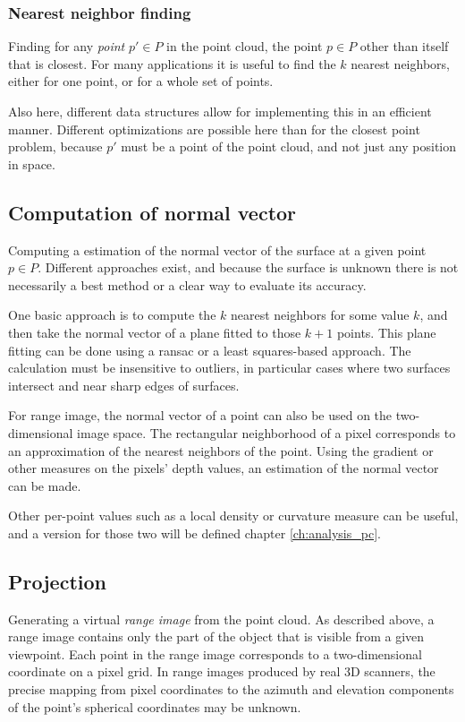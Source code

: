\subsubsection{Nearest neighbor finding}
Finding for any \emph{point} $p' \in P$ in the point cloud, the point $p \in P$ other than itself that is closest. For many applications it is useful to find the $k$ nearest neighbors, either for one point, or for a whole set of points.

Also here, different data structures allow for implementing this in an efficient manner. Different optimizations are possible here than for the closest point problem, because $p'$ must be a point of the point cloud, and not just any position in space.


\subsection{Computation of normal vector}
Computing a estimation of the normal vector of the surface at a given point $p \in P$. Different approaches exist, and because the surface is unknown there is not necessarily a best method or a clear way to evaluate its accuracy.

One basic approach is to compute the $k$ nearest neighbors for some value $k$, and then take the normal vector of a plane fitted to those $k + 1$ points. This plane fitting can be done using a \gls{ransac} or a least squares-based approach. The calculation must be insensitive to outliers, in particular cases where two surfaces intersect and near sharp edges of surfaces.

For range image, the normal vector of a point can also be used on the two-dimensional image space. The rectangular neighborhood of a pixel corresponds to an approximation of the nearest neighbors of the point. Using the gradient or other measures on the pixels' depth values, an estimation of the normal vector can be made.

Other per-point values such as a local density or curvature measure can be useful, and a version for those two will be defined chapter \ref{ch:analysis_pc}.


\subsection{Projection}
Generating a virtual \emph{range image} from the point cloud. As described above, a range image contains only the part of the object that is visible from a given viewpoint. Each point in the range image corresponds to a two-dimensional coordinate on a pixel grid. In range images produced by real 3D scanners, the precise mapping from pixel coordinates to the azimuth and elevation components of the point's spherical coordinates may be unknown.

